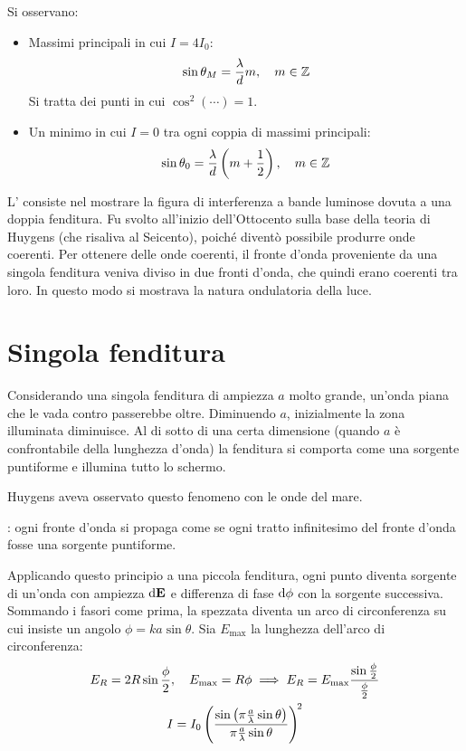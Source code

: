 Si osservano:
\begin{itemize}
    \item Massimi principali in cui $I = 4 I_0$:
        \begin{equation}
            \sin\theta_M = \frac{\lambda}{d} m, \quad m \in \mathbb{Z}
        \end{equation}
        Si tratta dei punti in cui $\cos^2(\cdots) = 1$.
    \item Un minimo in cui $I = 0$ tra ogni coppia di massimi principali:
        \begin{equation}
            \sin\theta_0 = \frac{\lambda}{d} \left( m + \frac{1}{2} \right), \quad
            m \in \mathbb{Z}
        \end{equation}
\end{itemize}

L' consiste nel mostrare la figura di interferenza a bande luminose dovuta a una doppia fenditura.
Fu svolto all'inizio dell'Ottocento sulla base della teoria di Huygens (che risaliva al Seicento), poiché diventò possibile produrre onde coerenti.
Per ottenere delle onde coerenti, il fronte d'onda proveniente da una singola fenditura veniva diviso in due fronti d'onda, che quindi erano coerenti tra loro.
In questo modo si mostrava la natura ondulatoria della luce.


\section{Singola fenditura}

Considerando una singola fenditura di ampiezza $a$ molto grande, un'onda piana che le vada contro passerebbe oltre.
Diminuendo $a$, inizialmente la zona illuminata diminuisce.
Al di sotto di una certa dimensione (quando $a$ è confrontabile della lunghezza d'onda) la fenditura si comporta come una sorgente puntiforme e illumina tutto lo schermo.

Huygens aveva osservato questo fenomeno con le onde del mare.

: ogni fronte d'onda si propaga come se ogni tratto infinitesimo del fronte d'onda fosse una sorgente puntiforme.


Applicando questo principio a una piccola fenditura, ogni punto diventa sorgente di un'onda con ampiezza $\mathrm{d}\mathbf{E}$ e differenza di fase $\mathrm{d}\phi$ con la sorgente successiva.
Sommando i fasori come prima, la spezzata diventa un arco di circonferenza su cui insiste un angolo $\phi = k a \sin\theta$.
Sia $E_\text{max}$ la lunghezza dell'arco di circonferenza:
\begin{gather}
    E_R = 2 R \sin \frac{\phi}{2}, \quad
    E_\text{max} = R \phi
    \implies
    E_R = E_\text{max} \frac{\sin\frac{\phi}{2}}{\frac{\phi}{2}} \\
    I = I_0 \left( \frac{\sin\left( \pi \frac{a}{\lambda} \sin\theta \right)}{\pi \frac{a}{\lambda} \sin\theta} \right)^{\!2}
\end{gather}

